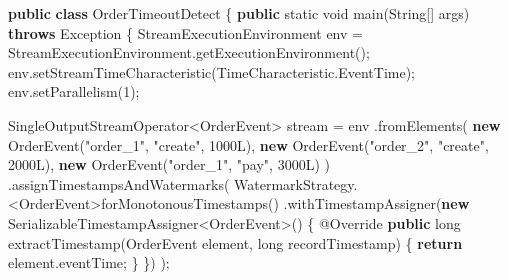 \documentclass[cn,11pt,chinese]{elegantbook}
\newenvironment{Shaded}{}{}
\newcommand{\AttributeTok}[1]{\textcolor[rgb]{0.49,0.56,0.16}{#1}}
\newcommand{\BuiltInTok}[1]{#1}
\newcommand{\DataTypeTok}[1]{\textcolor[rgb]{0.56,0.13,0.00}{#1}}
\newcommand{\DecValTok}[1]{\textcolor[rgb]{0.25,0.63,0.44}{#1}}
\newcommand{\FunctionTok}[1]{\textcolor[rgb]{0.02,0.16,0.49}{#1}}
\newcommand{\KeywordTok}[1]{\textcolor[rgb]{0.00,0.44,0.13}{\textbf{#1}}}
\newcommand{\NormalTok}[1]{#1}
\newcommand{\StringTok}[1]{\textcolor[rgb]{0.25,0.44,0.63}{#1}}
\begin{document}
\begin{Shaded}
\begin{Highlighting}[]
\KeywordTok{public} \KeywordTok{class}\NormalTok{ OrderTimeoutDetect \{}
    \KeywordTok{public} \DataTypeTok{static} \DataTypeTok{void} \FunctionTok{main}\NormalTok{(}\BuiltInTok{String}\NormalTok{[] args) }\KeywordTok{throws} \BuiltInTok{Exception}\NormalTok{ \{}
\NormalTok{        StreamExecutionEnvironment env = StreamExecutionEnvironment.}\FunctionTok{getExecutionEnvironment}\NormalTok{();}
\NormalTok{        env.}\FunctionTok{setStreamTimeCharacteristic}\NormalTok{(TimeCharacteristic.}\FunctionTok{EventTime}\NormalTok{);}
\NormalTok{        env.}\FunctionTok{setParallelism}\NormalTok{(}\DecValTok{1}\NormalTok{);}

\NormalTok{        SingleOutputStreamOperator\textless{}OrderEvent\textgreater{} stream = env}
\NormalTok{            .}\FunctionTok{fromElements}\NormalTok{(}
                \KeywordTok{new} \FunctionTok{OrderEvent}\NormalTok{(}\StringTok{"order\_1"}\NormalTok{, }\StringTok{"create"}\NormalTok{, }\DecValTok{1000L}\NormalTok{),}
                \KeywordTok{new} \FunctionTok{OrderEvent}\NormalTok{(}\StringTok{"order\_2"}\NormalTok{, }\StringTok{"create"}\NormalTok{, }\DecValTok{2000L}\NormalTok{),}
                \KeywordTok{new} \FunctionTok{OrderEvent}\NormalTok{(}\StringTok{"order\_1"}\NormalTok{, }\StringTok{"pay"}\NormalTok{, }\DecValTok{3000L}\NormalTok{)}
\NormalTok{            )}
\NormalTok{            .}\FunctionTok{assignTimestampsAndWatermarks}\NormalTok{(}
\NormalTok{                WatermarkStrategy.\textless{}OrderEvent\textgreater{}}\FunctionTok{forMonotonousTimestamps}\NormalTok{()}
\NormalTok{                    .}\FunctionTok{withTimestampAssigner}\NormalTok{(}\KeywordTok{new}\NormalTok{ SerializableTimestampAssigner\textless{}OrderEvent\textgreater{}() \{}
                        \AttributeTok{@Override}
                        \KeywordTok{public} \DataTypeTok{long} \FunctionTok{extractTimestamp}\NormalTok{(OrderEvent element, }\DataTypeTok{long}\NormalTok{ recordTimestamp) \{}
                            \KeywordTok{return}\NormalTok{ element.}\FunctionTok{eventTime}\NormalTok{;}
\NormalTok{                        \}}
\NormalTok{                    \})}
\NormalTok{            );}


\end{Highlighting}
\end{Shaded}
\end{document}
